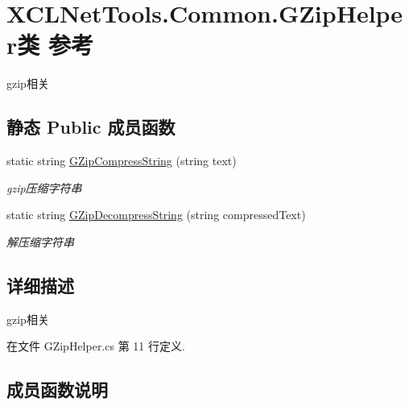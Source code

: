 \hypertarget{class_x_c_l_net_tools_1_1_common_1_1_g_zip_helper}{}\section{X\+C\+L\+Net\+Tools.\+Common.\+G\+Zip\+Helper类 参考}
\label{class_x_c_l_net_tools_1_1_common_1_1_g_zip_helper}


gzip相关  


\subsection*{静态 Public 成员函数}
\begin{DoxyCompactItemize}
\item 
static string \hyperlink{class_x_c_l_net_tools_1_1_common_1_1_g_zip_helper_ad3914d0de1ee45b5927c5cf242fd9893}{G\+Zip\+Compress\+String} (string text)
\begin{DoxyCompactList}\small\item\em gzip压缩字符串 \end{DoxyCompactList}\item 
static string \hyperlink{class_x_c_l_net_tools_1_1_common_1_1_g_zip_helper_a1bc9a866216b7c947e6c4aea6c8fef3d}{G\+Zip\+Decompress\+String} (string compressed\+Text)
\begin{DoxyCompactList}\small\item\em 解压缩字符串 \end{DoxyCompactList}\end{DoxyCompactItemize}


\subsection{详细描述}
gzip相关 



在文件 G\+Zip\+Helper.\+cs 第 11 行定义.



\subsection{成员函数说明}
